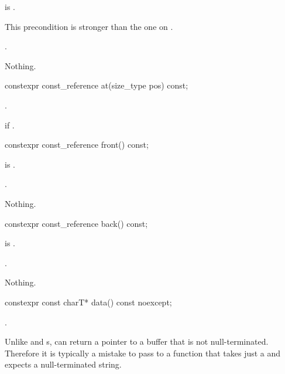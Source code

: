 \begin{itemdescr}
\pnum
\hardexpects
{} is .
\begin{note}
This precondition is stronger than the one on .
\end{note}

\pnum
\returns
{}.

\pnum
\throws
Nothing.
\end{itemdescr}

%
\begin{itemdecl}
constexpr const_reference at(size_type pos) const;
\end{itemdecl}

\begin{itemdescr}
\pnum
\returns
{}.

\pnum
\throws
{} if .
\end{itemdescr}

%
\begin{itemdecl}
constexpr const_reference front() const;
\end{itemdecl}

\begin{itemdescr}
\pnum
\hardexpects
{} is .

\pnum
\returns
{}.

\pnum
\throws
Nothing.
\end{itemdescr}

%
\begin{itemdecl}
constexpr const_reference back() const;
\end{itemdecl}

\begin{itemdescr}
\pnum
\hardexpects
{} is .

\pnum
\returns
{}.

\pnum
\throws
Nothing.
\end{itemdescr}

%
\begin{itemdecl}
constexpr const charT* data() const noexcept;
\end{itemdecl}

\begin{itemdescr}
\pnum
\returns
{}.

\pnum
\begin{note}
Unlike  and s,
 can return a pointer to a buffer that is not null-terminated.
Therefore it is typically a mistake to pass  to a function that takes just a  and expects a null-terminated string.
\end{note}
\end{itemdescr}

